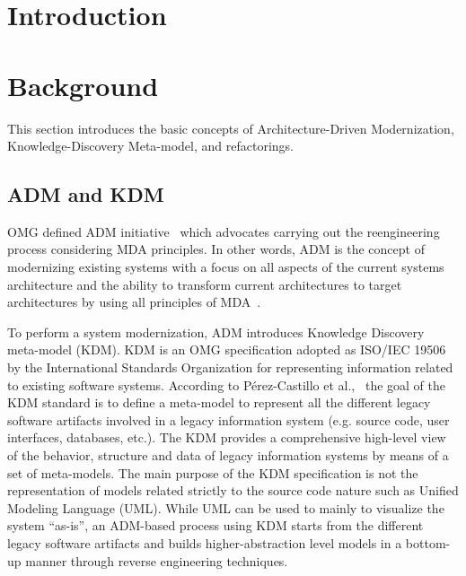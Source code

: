 \documentclass[12pt]{article}
\title{\papertitle}
\author{Rafael S. Durelli\inst{1}, Bruno  M. Santos\inst{2}, Raphael R. Honda\inst{2}, \\  M\'{a}rcio E. Delamaro\inst{1} and Valter V. de Camargo\inst{2}}
\let\cite=\citep
\begin{document}
 

\maketitle

\begin{abstract}

\end{abstract}
\section{Introduction\label{sec:introduction}}
 

% 

\section{Background\label{sec:KDM-RE}} 

This section introduces the basic concepts of Architecture-Driven Modernization, Knowledge-Discovery Meta-model, and refactorings. 

\subsection{ADM and KDM}

OMG defined ADM initiative~\cite{1686216} which advocates carrying out the reengineering process considering MDA principles. In other words, ADM is the concept of modernizing existing systems with a focus on all aspects of the current systems architecture and the ability to transform current architectures to target architectures by using all principles of MDA~\cite{Ulrich:2010:IST:1841736}.

To perform a system modernization, ADM introduces Knowledge Discovery meta-model (KDM). KDM is an OMG specification adopted as ISO/IEC 19506 by the International Standards Organization for representing information related to existing software systems. According to P\'{e}rez-Castillo et al.,~\cite{1686216} the goal of the KDM standard is to define a meta-model to represent all the different legacy software artifacts involved in a legacy information system (e.g. source code, user interfaces, databases, etc.). The KDM provides a comprehensive high-level view of the behavior, structure and data of legacy information systems by means of a set of meta-models. The main purpose of the KDM specification is not the representation of models related strictly to the source code nature such as Unified Modeling Language (UML). While UML can be used to mainly to visualize the system ``as-is'', an ADM-based process using KDM starts from the different legacy software artifacts and builds higher-abstraction level models in a bottom-up manner through reverse engineering techniques.
\end{document}
